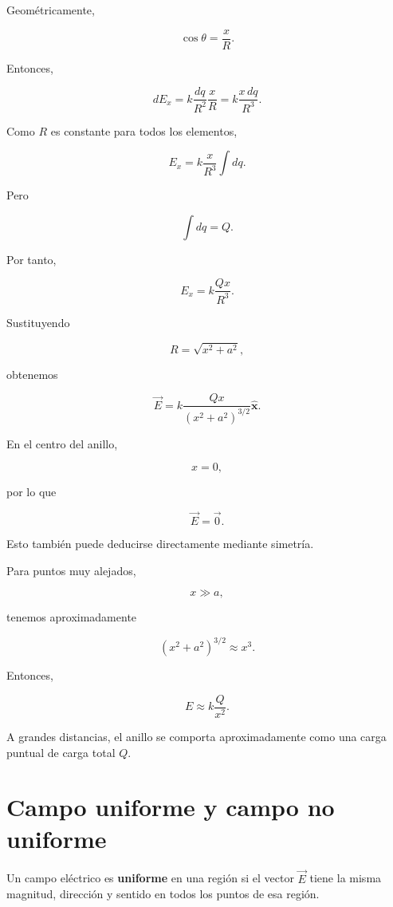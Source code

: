 Geométricamente,

\[
\cos\theta=\frac{x}{R}.
\]

Entonces,

\[
dE_x
=
k\frac{dq}{R^2}\frac{x}{R}
=
k\frac{x\,dq}{R^3}.
\]

Como \(R\) es constante para todos los elementos,

\[
E_x
=
k\frac{x}{R^3}\int dq.
\]

Pero

\[
\int dq=Q.
\]

Por tanto,

\[
E_x=k\frac{Qx}{R^3}.
\]

Sustituyendo

\[
R=\sqrt{x^2+a^2},
\]

obtenemos

\begin{equation}
\boxed{
\vec E
=
k\frac{Qx}{(x^2+a^2)^{3/2}}\hat{\mathbf x}
}.
\label{eq:campo_anillo_eje}
\end{equation}

\begin{interpretacion}

En el centro del anillo,

\[
x=0,
\]

por lo que

\[
\boxed{\vec E=\vec 0}.
\]

Esto también puede deducirse directamente mediante simetría.

Para puntos muy alejados,

\[
x\gg a,
\]

tenemos aproximadamente

\[
(x^2+a^2)^{3/2}\approx x^3.
\]

Entonces,

\[
E\approx k\frac{Q}{x^2}.
\]

A grandes distancias, el anillo se comporta aproximadamente como una carga puntual
de carga total \(Q\).

\end{interpretacion}


\section{Campo uniforme y campo no uniforme}

Un campo eléctrico es \textbf{uniforme} en una región si el vector \(\vec E\) tiene
la misma magnitud, dirección y sentido en todos los puntos de esa región.

